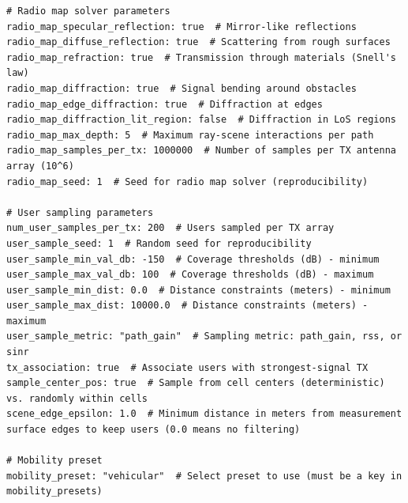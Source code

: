 \documentclass{article}
\begin{document}
\begin{verbatim}
# Radio map solver parameters
radio_map_specular_reflection: true  # Mirror-like reflections
radio_map_diffuse_reflection: true  # Scattering from rough surfaces
radio_map_refraction: true  # Transmission through materials (Snell's law)
radio_map_diffraction: true  # Signal bending around obstacles
radio_map_edge_diffraction: true  # Diffraction at edges
radio_map_diffraction_lit_region: false  # Diffraction in LoS regions
radio_map_max_depth: 5  # Maximum ray-scene interactions per path
radio_map_samples_per_tx: 1000000  # Number of samples per TX antenna array (10^6)
radio_map_seed: 1  # Seed for radio map solver (reproducibility)

# User sampling parameters
num_user_samples_per_tx: 200  # Users sampled per TX array
user_sample_seed: 1  # Random seed for reproducibility
user_sample_min_val_db: -150  # Coverage thresholds (dB) - minimum
user_sample_max_val_db: 100  # Coverage thresholds (dB) - maximum
user_sample_min_dist: 0.0  # Distance constraints (meters) - minimum
user_sample_max_dist: 10000.0  # Distance constraints (meters) - maximum
user_sample_metric: "path_gain"  # Sampling metric: path_gain, rss, or sinr
tx_association: true  # Associate users with strongest-signal TX
sample_center_pos: true  # Sample from cell centers (deterministic) vs. randomly within cells
scene_edge_epsilon: 1.0  # Minimum distance in meters from measurement surface edges to keep users (0.0 means no filtering)

# Mobility preset
mobility_preset: "vehicular"  # Select preset to use (must be a key in mobility_presets)


\end{verbatim}
\end{document}
